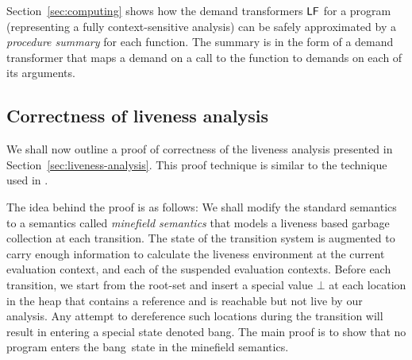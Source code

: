 \documentclass[9pt]{sigplanconf}
\newcommand{\bang}{\mbox{\sc bang}}
\begin{document}
Section~\ref{sec:computing}   shows   how  the   demand   transformers
$\mathsf{LF}$  for  a  program  (representing  a  fully  context-sensitive
analysis) can be safely approximated  by a {\em procedure summary} for
each function.   The summary is  in the  form of a  demand transformer
that maps a demand on a call to the function to demands on each of its
arguments.

\subsection{Correctness of liveness analysis}  

We shall now  outline a proof of correctness of  the liveness analysis
presented   in    Section~\ref{sec:liveness-analysis}.    This   proof
technique  is  similar to  the  technique  used in  \cite{asati14lgc}.

The idea behind the proof is  as follows: We shall modify the standard
semantics to a semantics  called {\em minefield semantics} that models
a liveness based garbage collection  at each transition.  The state of
the  transition system  is augmented  to carry  enough  information to
calculate the liveness environment  at the current evaluation context,
and  each   of  the   suspended  evaluation  contexts.    Before  each
transition,  we start  from the  root-set and  insert a  special value
$\bot$ at each  location in the heap that contains  a reference and is
reachable but  not live by  our analysis.  Any attempt  to dereference
such locations during the transition will result in entering a special
state denoted \bang.  The main proof is to show that no program enters
the \bang\ state in the minefield semantics.
 

\newcommand{\cred}[1]{\psframebox[linestyle=none,
    fillcolor=lightgray,fillstyle=solid,framesep=0.5pt]{#1}}
\end{document}
